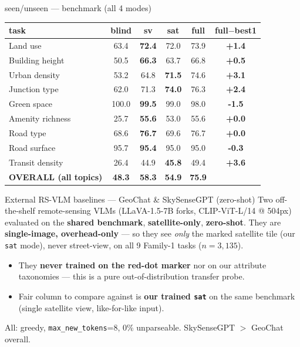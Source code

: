 \documentclass[aspectratio=169]{beamer}
\begin{document}
\begin{frame}{seen/unseen --- benchmark (all 4 modes)}
\centering\footnotesize
\begin{tabular}{lcccc>{\bfseries}c}
\toprule
task & blind & sv & sat & full & full$-$best1 \\
\midrule
Land use & 63.4 & \textbf{72.4} & 72.0 & 73.9 & \textcolor{good}{+1.4} \\
Building height & 50.5 & \textbf{66.3} & 63.7 & 66.8 & +0.5 \\
Urban density & 53.2 & 64.8 & \textbf{71.5} & 74.6 & \textcolor{good}{+3.1} \\
Junction type & 62.0 & 71.3 & \textbf{74.0} & 76.3 & \textcolor{good}{+2.4} \\
Green space & 100.0 & \textbf{99.5} & 99.0 & 98.0 & \textcolor{bad}{-1.5} \\
Amenity richness & 25.7 & \textbf{55.6} & 53.0 & 55.6 & +0.0 \\
Road type & 68.6 & \textbf{76.7} & 69.6 & 76.7 & +0.0 \\
Road surface & 95.7 & \textbf{95.4} & 95.0 & 95.0 & -0.3 \\
Transit density & 26.4 & 44.9 & \textbf{45.8} & 49.4 & \textcolor{good}{+3.6} \\
\midrule
\textbf{OVERALL (all topics)} & \textbf{48.3} & \textbf{58.3} & \textbf{54.9} & \textbf{75.9} & \\
\bottomrule
\end{tabular}
\end{frame}

\begin{frame}{External RS-VLM baselines --- GeoChat \& SkySenseGPT (zero-shot)}
\small
Two off-the-shelf remote-sensing VLMs (LLaVA-1.5-7B forks, CLIP-ViT-L/14 @ 504px)
evaluated on the \textbf{shared benchmark}, \textbf{satellite-only}, \textbf{zero-shot}.
They are \textbf{single-image, overhead-only} --- so they see \emph{only} the marked
satellite tile (our \texttt{sat} mode), never street-view, on all 9 Family-1 tasks
($n=3{,}135$).\\[4pt]
\begin{itemize}
\item They \textbf{never trained on the red-dot marker} nor on our attribute taxonomies
  --- this is a pure out-of-distribution transfer probe.
\item Fair column to compare against is \textbf{our trained \texttt{sat}} on the same
  benchmark (single satellite view, like-for-like input).
\end{itemize}
All: greedy, \texttt{max\_new\_tokens}=8, 0\% unparseable. SkySenseGPT $>$ GeoChat overall.
\end{frame}
\end{document}
